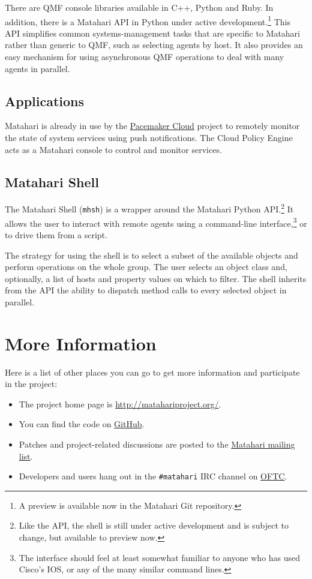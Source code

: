 \documentclass{tufte-handout}
\begin{document}
There are QMF console libraries available in C++, Python and Ruby.
In addition, there is a Matahari API in Python under active development.\footnote{A preview is available now in the Matahari Git repository.} This API simplifies common systems-management tasks that are specific to Matahari rather than generic to QMF, such as selecting agents by host. It also provides an easy mechanism for using asynchronous QMF operations to deal with many agents in parallel.

\subsection{Applications}

Matahari is already in use by the \href{http://pacemaker-cloud.org/}{Pacemaker Cloud} project to remotely monitor the state of system services using push notifications. The Cloud Policy Engine acts as a Matahari console to control and monitor services.

\subsection{Matahari Shell}

The Matahari Shell (\texttt{mhsh}) is a wrapper around the Matahari Python API.\footnote{Like the API, the shell is still under active development and is subject to change, but available to preview now.} It allows the user to interact with remote agents using a command-line interface,\footnote{The interface should feel at least somewhat familiar to anyone who has used Cisco's IOS, or any of the many similar command lines.} or to drive them from a script.

The strategy for using the shell is to select a subset of the available objects and perform operations on the whole group.
The user selects an object class and, optionally, a list of hosts and property values on which to filter.
The shell inherits from the API the ability to dispatch method calls to every selected object in parallel.

\section{More Information}

Here is a list of other places you can go to get more information and participate in the project:

\begin{itemize}
\item The project home page is \url{http://matahariproject.org/}.
\item You can find the code on \href{https://github.com/matahari/matahari}{GitHub}.
\item Patches and project-related discussions are posted to the \href{https://fedorahosted.org/mailman/listinfo/matahari}{Matahari mailing list}.
\item Developers and users hang out in the \texttt{\#matahari} IRC channel on \href{http://www.oftc.net/}{OFTC}.
\end{itemize}
\end{document}
